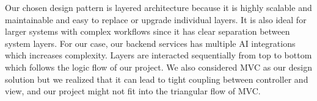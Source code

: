 \documentclass[12pt, titlepage]{article}
\begin{document}
\begin{enumerate}
  Our chosen design pattern is layered architecture because it is highly scalable and maintainable and easy to replace or upgrade individual layers. It is also ideal for larger systems with complex workflows since it has clear separation between system layers. For our case, our backend services has multiple AI integrations which increases complexity. Layers are interacted sequentially from top to bottom which follows the logic flow of our project. We also considered MVC as our design solution but we realized that it can lead to tight coupling between controller and view, and our project might not fit into the triangular flow of MVC.
\end{enumerate}

  
\end{document}
